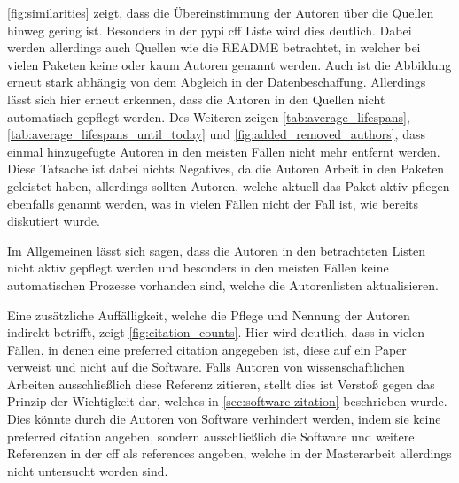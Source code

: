 \autoref{fig:similarities} zeigt, dass die Übereinstimmung der Autoren über die Quellen hinweg gering ist.
Besonders in der \gls{pypi} \gls{cff} Liste wird dies deutlich.
Dabei werden allerdings auch Quellen wie die README betrachtet, in welcher bei vielen Paketen keine oder kaum Autoren genannt werden.
Auch ist die Abbildung erneut stark abhängig von dem Abgleich in der Datenbeschaffung.
Allerdings lässt sich hier erneut erkennen, dass die Autoren in den Quellen nicht automatisch gepflegt werden.
Des Weiteren zeigen \autoref{tab:average_lifespans}, \autoref{tab:average_lifespans_until_today} und \autoref{fig:added_removed_authors}, dass einmal hinzugefügte Autoren in den meisten Fällen nicht mehr entfernt werden.
Diese Tatsache ist dabei nichts Negatives, da die Autoren Arbeit in den Paketen geleistet haben, allerdings sollten Autoren, welche aktuell das Paket aktiv pflegen ebenfalls genannt werden, was in vielen Fällen nicht der Fall ist, wie bereits diskutiert wurde.

Im Allgemeinen lässt sich sagen, dass die Autoren in den betrachteten Listen nicht aktiv gepflegt werden und besonders in den meisten Fällen keine automatischen Prozesse vorhanden sind, welche die Autorenlisten aktualisieren.

Eine zusätzliche Auffälligkeit, welche die Pflege und Nennung der Autoren indirekt betrifft, zeigt \autoref{fig:citation_counts}.
Hier wird deutlich, dass in vielen Fällen, in denen eine \glqq preferred citation\grqq{} angegeben ist, diese auf ein Paper verweist und nicht auf die Software.
Falls Autoren von wissenschaftlichen Arbeiten ausschließlich diese Referenz zitieren, stellt dies ist Verstoß gegen das Prinzip der Wichtigkeit dar, welches in \autoref{sec:software-zitation} beschrieben wurde.
Dies könnte durch die Autoren von Software verhindert werden, indem sie keine \glqq preferred citation\grqq{} angeben, sondern ausschließlich die Software und weitere Referenzen in der \gls{cff} als \glqq references\grqq{} angeben, welche in der Masterarbeit allerdings nicht untersucht worden sind.
